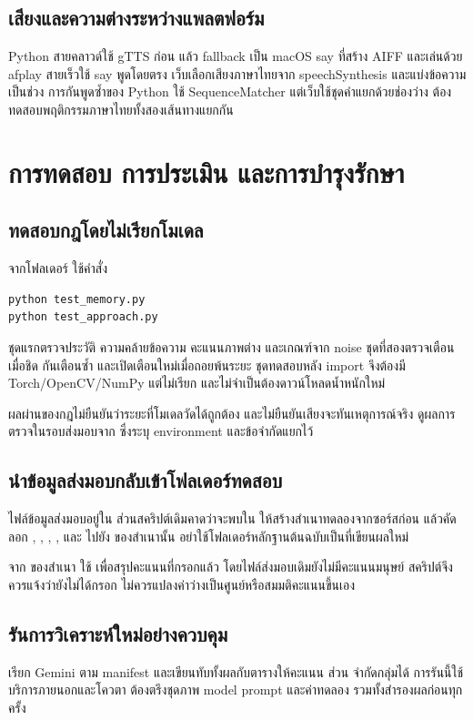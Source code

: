 \section{เสียงและความต่างระหว่างแพลตฟอร์ม}
Python สายคลาวด์ใช้ gTTS ก่อน แล้ว fallback เป็น macOS say ที่สร้าง AIFF และเล่นด้วย afplay สายเร็วใช้ say พูดโดยตรง เว็บเลือกเสียงภาษาไทยจาก speechSynthesis และแบ่งข้อความเป็นช่วง การกันพูดซ้ำของ Python ใช้ SequenceMatcher แต่เว็บใช้ชุดคำแยกด้วยช่องว่าง ต้องทดสอบพฤติกรรมภาษาไทยทั้งสองเส้นทางแยกกัน

\chapter{การทดสอบ การประเมิน และการบำรุงรักษา}
\section{ทดสอบกฎโดยไม่เรียกโมเดล}
จากโฟลเดอร์  ใช้คำสั่ง
\begin{verbatim}
python test_memory.py
python test_approach.py
\end{verbatim}
ชุดแรกตรวจประวัติ ความคล้ายข้อความ คะแนนภาพต่าง และเกณฑ์จาก noise ชุดที่สองตรวจเตือนเมื่อชิด กันเตือนซ้ำ และเปิดเตือนใหม่เมื่อถอยพ้นระยะ ชุดทดสอบหลัง import  จึงต้องมี Torch/OpenCV/NumPy แต่ไม่เรียก  และไม่จำเป็นต้องดาวน์โหลดน้ำหนักใหม่

ผลผ่านของกฎไม่ยืนยันว่าระยะที่โมเดลวัดได้ถูกต้อง และไม่ยืนยันเสียงจะทันเหตุการณ์จริง ดูผลการตรวจในรอบส่งมอบจาก  ซึ่งระบุ environment และข้อจำกัดแยกไว้

\section{นำข้อมูลส่งมอบกลับเข้าโฟลเดอร์ทดสอบ}
ไฟล์ข้อมูลส่งมอบอยู่ใน  ส่วนสคริปต์เดิมคาดว่าจะพบใน  ให้สร้างสำเนาทดลองจากซอร์สก่อน แล้วคัดลอก , , , ,  และ  ไปยัง  ของสำเนานั้น อย่าใช้โฟลเดอร์หลักฐานต้นฉบับเป็นที่เขียนผลใหม่

จาก  ของสำเนา ใช้  เพื่อสรุปคะแนนที่กรอกแล้ว โดยไฟล์ส่งมอบเดิมยังไม่มีคะแนนมนุษย์ สคริปต์จึงควรแจ้งว่ายังไม่ได้กรอก ไม่ควรแปลงค่าว่างเป็นศูนย์หรือสมมติคะแนนขึ้นเอง

\section{รันการวิเคราะห์ใหม่อย่างควบคุม}
 เรียก Gemini ตาม manifest และเขียนทับทั้งผลกับตารางให้คะแนน ส่วน  จำกัดกลุ่มได้ การรันนี้ใช้บริการภายนอกและโควตา ต้องตรึงชุดภาพ model prompt และค่าทดลอง รวมทั้งสำรองผลก่อนทุกครั้ง

